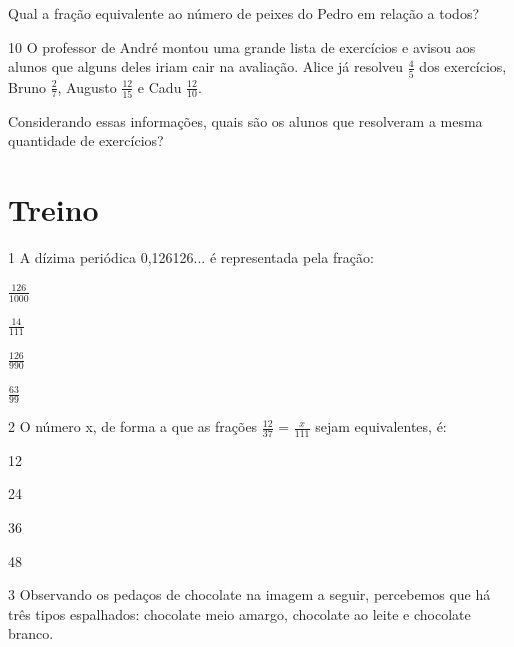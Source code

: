\pagebreak
Qual a fração equivalente ao número de peixes do Pedro em relação a
todos?

\begin{emptybox}
\end{emptybox}

\num{10} O professor de André montou uma grande lista de exercícios 
e avisou aos alunos que alguns deles iriam cair na avaliação. Alice
já resolveu $\frac{4}{5}$ dos exercícios, Bruno $\frac{2}{7}$, Augusto 
$\frac{12}{15}$ e Cadu $\frac{12}{10}$.

Considerando essas informações, quais são os alunos que resolveram a mesma
quantidade de exercícios?


\section*{Treino}

\num{1} A dízima periódica 0,126126... é representada pela fração:

\begin{escolha}

\item $\frac{126}{1000}$
\item $\frac{14}{111}$
\item $\frac{126}{990}$
\item $\frac{63}{99}$

\end{escolha}

\num{2} O número x, de forma a que as frações $\frac{12}{37}$ = $\frac{x}{111}$ sejam equivalentes, é:

\begin{escolha}

\item 12
\item 24
\item 36
\item 48

\end{escolha}

\pagebreak
\num{3} Observando os pedaços de chocolate na imagem a seguir, percebemos 
que há três tipos espalhados: chocolate meio amargo, chocolate ao leite e
chocolate branco. 

